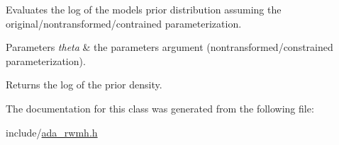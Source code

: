 Evaluates the log of the model\textquotesingle{}s prior distribution assuming the original/nontransformed/contrained parameterization. 


\begin{DoxyParams}{Parameters}
{\em theta} & the parameters argument (nontransformed/constrained parameterization). \\
\hline
\end{DoxyParams}
\begin{DoxyReturn}{Returns}
the log of the prior density. 
\end{DoxyReturn}


The documentation for this class was generated from the following file\+:\begin{DoxyCompactItemize}
\item 
include/\hyperlink{ada__rwmh_8h}{ada\+\_\+rwmh.\+h}\end{DoxyCompactItemize}
